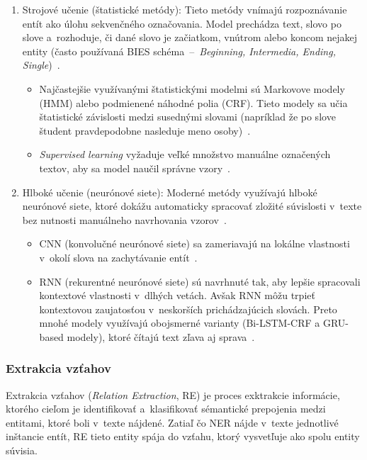 \begin{enumerate}
  \item Strojové učenie (štatistické metódy): Tieto metódy vnímajú rozpoznávanie entít ako úlohu sekvenčného označovania. Model prechádza text, slovo po slove a~rozhoduje, či dané slovo je začiatkom, vnútrom alebo koncom nejakej entity (často používaná BIES schéma~--~\textit{Beginning, Intermedia, Ending, Single})~\cite{autKGconstruction2023}.
  \begin{itemize}
    \item Najčastejšie využívanými štatistickými modelmi sú Markovove modely (HMM) alebo podmienené náhodné polia (CRF). Tieto modely sa učia štatistické závislosti medzi susednými slovami (napríklad že po slove študent pravdepodobne nasleduje meno osoby)~\cite{autKGconstruction2023}. 
    \item \textit{Supervised learning} vyžaduje veľké množstvo manuálne označených textov, aby sa model naučil správne vzory~\cite{autKGconstruction2023}.
  \end{itemize}

  \item Hlboké učenie (neurónové siete): Moderné metódy využívajú hlboké neurónové siete, ktoré dokážu automaticky spracovať zložité súvislosti v~texte bez nutnosti manuálneho navrhovania vzorov~\cite{autKGconstruction2023}.
  \begin{itemize}
    \item CNN (konvolučné neurónové siete) sa zameriavajú na lokálne vlastnosti v~okolí slova na zachytávanie entít~\cite{autKGconstruction2023}.
    \item RNN (rekurentné neurónové siete) sú navrhnuté tak, aby lepšie spracovali kontextové vlastnosti v~dlhých vetách. Avšak RNN môžu trpieť kontextovou zaujatosťou v~neskorších prichádzajúcich slovách. Preto mnohé modely využívajú obojsmerné varianty (Bi-LSTM-CRF a GRU-based modely), ktoré čítajú text zľava aj sprava~\cite{autKGconstruction2023}.
  \end{itemize}
\end{enumerate}


\subsubsection{Extrakcia vzťahov}

Extrakcia vzťahov (\textit{Relation Extraction}, RE) je proces exktrakcie informácie, ktorého cieľom je identifikovať a~klasifikovať sémantické prepojenia medzi entitami, ktoré boli v~texte nájdené. Zatiaľ čo NER nájde v~texte jednotlivé inštancie entít, RE tieto entity spája do vzťahu, ktorý vysvetľuje ako spolu entity súvisia.

